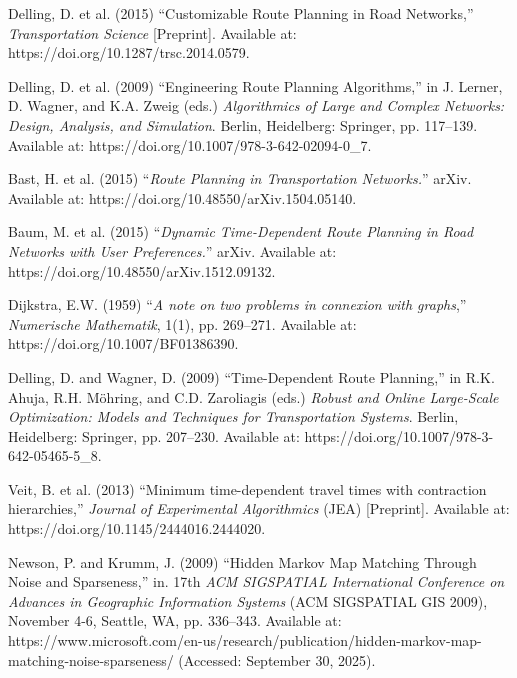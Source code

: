 \begin{thebibliography}{99}
    
        Delling, D. et al. (2015) “Customizable Route Planning in Road Networks,” \textit{Transportation Science} [Preprint]. Available at: https://doi.org/10.1287/trsc.2014.0579.

       
        Delling, D. et al. (2009) “Engineering Route Planning Algorithms,” in J. Lerner, D. Wagner, and K.A. Zweig (eds.) \textit{Algorithmics of Large and Complex Networks: Design, Analysis, and Simulation}. Berlin, Heidelberg: Springer, pp. 117–139. Available at: https://doi.org/10.1007/978-3-642-02094-0\_7.

          
        Bast, H. et al. (2015) “\textit{Route Planning in Transportation Networks.}” arXiv. Available at: https://doi.org/10.48550/arXiv.1504.05140.


        Baum, M. et al. (2015) “\textit{Dynamic Time-Dependent Route Planning in Road Networks with User Preferences.}” arXiv. Available at: https://doi.org/10.48550/arXiv.1512.09132.

        Dijkstra, E.W. (1959) “\textit{A note on two problems in connexion with graphs},” \textit{Numerische Mathematik}, 1(1), pp. 269–271. Available at: https://doi.org/10.1007/BF01386390.

        Delling, D. and Wagner, D. (2009) “Time-Dependent Route Planning,” in R.K. Ahuja, R.H. Möhring, and C.D. Zaroliagis (eds.) \textit{Robust and Online Large-Scale Optimization: Models and Techniques for Transportation Systems}. Berlin, Heidelberg: Springer, pp. 207–230. Available at: https://doi.org/10.1007/978-3-642-05465-5\_8.

        
        
        Veit, B. et al. (2013) “Minimum time-dependent travel times with contraction hierarchies,” \textit{Journal of Experimental Algorithmics} (JEA) [Preprint]. Available at: https://doi.org/10.1145/2444016.2444020.


        Newson, P. and Krumm, J. (2009) “Hidden Markov Map Matching Through Noise and Sparseness,” in. 17th \textit{ACM SIGSPATIAL International Conference on Advances in Geographic Information Systems} (ACM SIGSPATIAL GIS 2009), November 4-6, Seattle, WA, pp. 336–343. Available at: https://www.microsoft.com/en-us/research/publication/hidden-markov-map-matching-noise-sparseness/ (Accessed: September 30, 2025).



\end{thebibliography}
